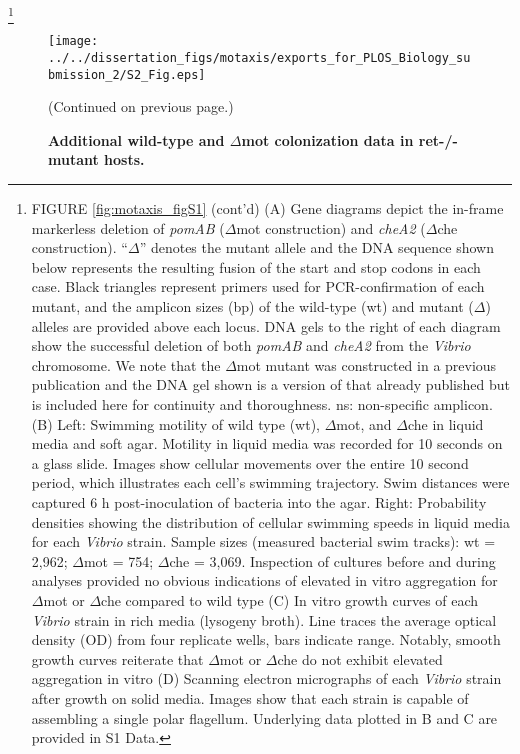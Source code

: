 {{{{{{{{\let\thefootnote\relax\footnote{FIGURE \ref{fig:motaxis_figS1} (cont'd) (A) Gene diagrams depict the in-frame markerless deletion of \textit{pomAB} ($\Delta$mot construction) and \textit{cheA2} ($\Delta$che construction). ``$\Delta$'' denotes the mutant allele and the DNA sequence shown below represents the resulting fusion of the start and stop codons in each case. Black triangles represent primers used for PCR-confirmation of each mutant, and the amplicon sizes (bp) of the wild-type (wt) and mutant ($\Delta$) alleles are provided above each locus. DNA gels to the right of each diagram show the successful deletion of both \textit{pomAB} and \textit{cheA2} from the \textit{Vibrio} chromosome. We note that the $\Delta$mot mutant was constructed in a previous publication \cite{wiles_modernized_2018} and the DNA gel shown is a version of that already published but is included here for continuity and thoroughness. ns: non-specific amplicon. (B) Left: Swimming motility of wild type (wt), $\Delta$mot, and $\Delta$che in liquid media and soft agar. Motility in liquid media was recorded for 10 seconds on a glass slide. Images show cellular movements over the entire 10 second period, which illustrates each cell's swimming trajectory. Swim distances were captured 6 h post-inoculation of bacteria into the agar. Right: Probability densities showing the distribution of cellular swimming speeds in liquid media for each \textit{Vibrio} strain. Sample sizes (measured bacterial swim tracks): wt = 2,962; $\Delta$mot = 754; $\Delta$che = 3,069. Inspection of cultures before and during analyses provided no obvious indications of elevated in vitro aggregation for $\Delta$mot or $\Delta$che compared to wild type  (C) In vitro growth curves of each \textit{Vibrio} strain in rich media (lysogeny broth). Line traces the average optical density (OD) from four replicate wells, bars indicate range. Notably, smooth growth curves reiterate that $\Delta$mot or $\Delta$che do not exhibit elevated aggregation in vitro  (D) Scanning electron micrographs of each \textit{Vibrio} strain after growth on solid media. Images show that each strain is capable of assembling a single polar flagellum. Underlying data plotted in B and C are provided in S1 Data.}

\newpage

\begin{figure}%
	\centerline{
		\texttt{[image: ../../dissertation\_figs/motaxis/exports\_for\_PLOS\_Biology\_submission\_2/S2\_Fig.eps]}}
	\caption{\textbf{Additional wild-type and $\Delta$mot colonization data in ret-/- mutant hosts.}}{(Continued on previous page.)}
	\label{fig:motaxis_figS2}
\end{figure}

}}}}}}}}
